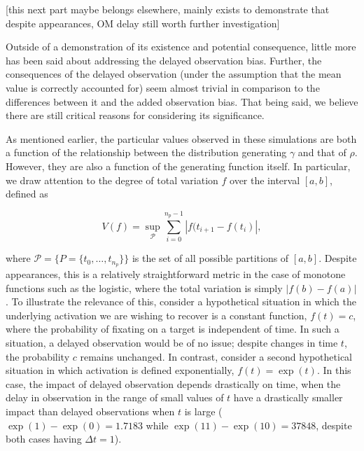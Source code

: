 [this next part maybe belongs elsewhere, mainly exists to demonstrate that despite appearances, OM delay still worth further investigation]

Outside of a demonstration of its existence and potential consequence, little more has been said about addressing the delayed observation bias. Further, the consequences of the delayed observation (under the assumption that the mean value is correctly accounted for) seem almost trivial in comparison to the differences between it and the added observation bias. That being said, we believe there are still critical reasons for considering its significance.

As mentioned earlier, the particular values observed in these simulations are both a function of the relationship between the distribution generating $\gamma$ and that of $\rho$. However, they are also a function of the generating function itself. In particular, we draw attention to the degree of total variation $f$ over the interval $[a,b]$, defined as 

\begin{equation}
V(f) = \underset{\mathcal{P}}{\sup} \sum_{i=0}^{n_p-1} \left|f(t_{i+1} - f(t_i) \right|,
\end{equation}

where $\mathcal{P} = \{P = \{t_0, \dots, t_{n_p}\} \}$ is the set of all possible partitions of $[a,b]$. Despite appearances, this is a relatively straightforward metric in the case of monotone functions such as the logistic, where the total variation is simply $|f(b) - f(a)|$. To illustrate the relevance of this, consider a hypothetical situation in which the underlying activation we are wishing to recover is a constant function, $f(t) = c$, where the probability of fixating on a target is independent of time. In such a situation, a delayed observation would be of no issue; despite changes in time $t$, the probability $c$ remains unchanged. In contrast, consider a second hypothetical situation in which activation is defined exponentially, $f(t) = \exp(t)$. In this case, the impact of delayed observation depends drastically on time, when the delay in observation in the range of small values of $t$ have a drastically smaller impact than delayed observations when $t$ is large ($\exp(1) - \exp(0) = 1.7183$ while $\exp(11) - \exp(10) = 37848$, despite both cases having $\Delta t = 1$).

